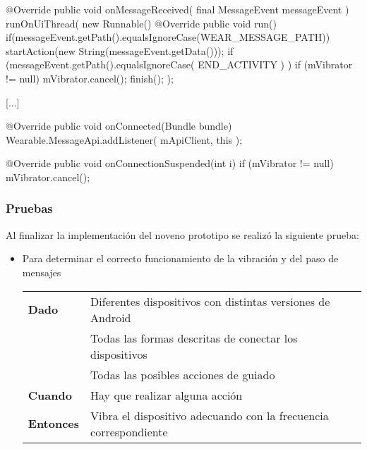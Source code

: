 \begin{definitionlist}
\begin{listing}[
  language = java,
  caption  = {Métodos utilizados en los servidores para leer los mensajes recibidos por medio de los
              Play Services },
  label    = code:servidorWearActivity]
[...]

@Override
public void onMessageReceived( final MessageEvent messageEvent ) {
  runOnUiThread( new Runnable() {
    @Override
    public void run() {
      if(messageEvent.getPath().equalsIgnoreCase(WEAR_MESSAGE_PATH)) {
        startAction(new String(messageEvent.getData()));
      }
      if (messageEvent.getPath().equalsIgnoreCase( END_ACTIVITY ) ) {
        if (mVibrator != null) {
          mVibrator.cancel();
        }
        finish();
      }
    }
  });
}
    
[...]
    
@Override
public void onConnected(Bundle bundle) {
    Wearable.MessageApi.addListener( mApiClient, this );
}

@Override
public void onConnectionSuspended(int i) {
    if (mVibrator != null) {
        mVibrator.cancel();
    }
}
\end{listing}

\end{definitionlist}

\subsubsection{Pruebas}

Al finalizar la implementación del noveno prototipo se realizó la siguiente prueba:

\begin{itemize}
  \item Para determinar el correcto funcionamiento de la vibración y del paso de mensajes

  \begin{tabular}{p{}p{}}
    \hline
    \textbf{Dado}     & Diferentes dispositivos con distintas versiones de Android \\
                      & Todas las formas descritas de conectar los dispositivos \\
                      & Todas las posibles acciones de guiado \\
    \textbf{Cuando}   & Hay que realizar alguna acción \\
    \textbf{Entonces} & Vibra el dispositivo adecuando con la frecuencia correspondiente \\
    \hline
  \end{tabular}
\end{itemize}

